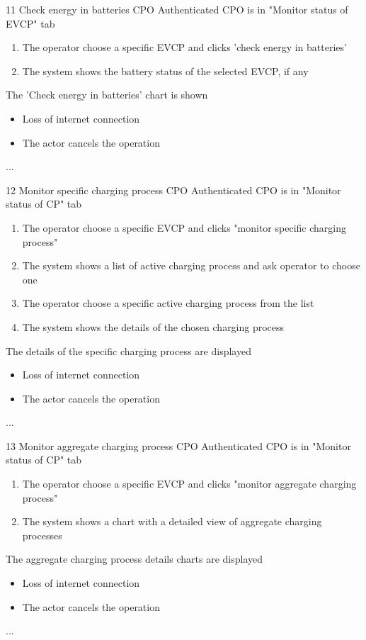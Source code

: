 \usecase
{11}
{Check energy in batteries} %
{CPO} %
{Authenticated CPO is in "Monitor status of EVCP" tab} %
{ %
    \begin{enumerate}
        \item The operator choose a specific EVCP and clicks 'check energy in batteries'
        \item The system shows the battery status of the selected EVCP, if any
    \end{enumerate}
}
{The 'Check energy in batteries' chart is shown} %
{ %
    \begin{itemize}
        \item Loss of internet connection
        \item The actor cancels the operation
    \end{itemize}
}
{ %
    ...
}

\usecase
{12}
{Monitor specific charging process} %
{CPO} %
{Authenticated CPO is in "Monitor status of CP" tab} %
{ %
    \begin{enumerate}
        \item The operator choose a specific EVCP and clicks "monitor specific charging process"
        \item The system shows a list of active charging process and ask operator to choose one
        \item The operator choose a specific active charging process from the list
        \item The system shows the details of the chosen charging process
    \end{enumerate}
}
{The details of the specific charging process are displayed} %
{ %
    \begin{itemize}
        \item Loss of internet connection
        \item The actor cancels the operation
    \end{itemize}
}
{ %
    ...
}

\usecase
{13}
{Monitor aggregate charging process} %
{CPO} %
{Authenticated CPO is in "Monitor status of CP" tab} %
{ %
    \begin{enumerate}
        \item The operator choose a specific EVCP and clicks "monitor aggregate charging process"
        \item The system shows a chart with a detailed view of aggregate charging processes
    \end{enumerate}
}
{The aggregate charging process details charts are displayed} %
{ %
    \begin{itemize}
        \item Loss of internet connection
        \item The actor cancels the operation
    \end{itemize}
}
{ %
    ...
}

